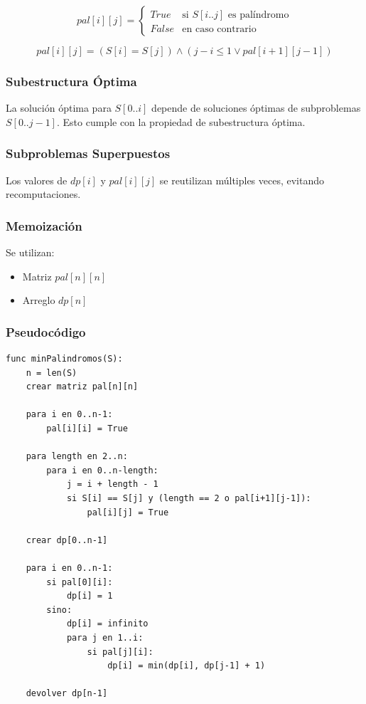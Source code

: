 \[
pal[i][j] =
\begin{cases}
True & \text{si } S[i..j] \text{ es palíndromo} \\
False & \text{en caso contrario}
\end{cases}
\]

\[
pal[i][j] = (S[i] = S[j]) \land (j - i \leq 1 \lor pal[i+1][j-1])
\]

\subsubsection{Subestructura Óptima}

La solución óptima para $S[0..i]$ depende de soluciones óptimas de subproblemas $S[0..j-1]$. Esto cumple con la propiedad de subestructura óptima.

\subsubsection{Subproblemas Superpuestos}

Los valores de $dp[i]$ y $pal[i][j]$ se reutilizan múltiples veces, evitando recomputaciones.

\subsubsection{Memoización}

Se utilizan:
\begin{itemize}
    \item Matriz $pal[n][n]$
    \item Arreglo $dp[n]$
\end{itemize}

\subsubsection{Pseudocódigo}

\begin{lstlisting}
func minPalindromos(S):
    n = len(S)
    crear matriz pal[n][n]

    para i en 0..n-1:
        pal[i][i] = True

    para length en 2..n:
        para i en 0..n-length:
            j = i + length - 1
            si S[i] == S[j] y (length == 2 o pal[i+1][j-1]):
                pal[i][j] = True

    crear dp[0..n-1]

    para i en 0..n-1:
        si pal[0][i]:
            dp[i] = 1
        sino:
            dp[i] = infinito
            para j en 1..i:
                si pal[j][i]:
                    dp[i] = min(dp[i], dp[j-1] + 1)

    devolver dp[n-1]
\end{lstlisting}

